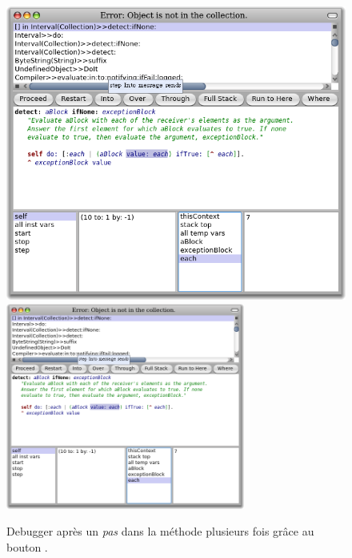 \documentclass[a4paper,10pt,twoside]{book}
\begin{document}
\begin{figure}[btp]
	\begin{center}
	\ifluluelse
		{\includegraphics[width=\textwidth]{steppingIntoValue}}
		{\includegraphics[width=0.7\textwidth]{steppingIntoValue}}
	\end{center}
	\caption{Debugger après un \emph{pas}  dans la méthode
       plusieurs fois grâce au bouton .}
\end{figure}
\end{document}
